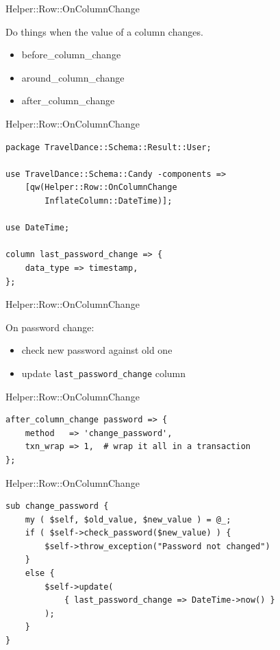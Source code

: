 \begin{frame}[fragile]{Helper::Row::OnColumnChange}

Do things when the value of a column changes.

\begin{itemize}
\item before\_column\_change
\item around\_column\_change
\item after\_column\_change
\end{itemize}

\end{frame}

\begin{frame}[fragile]{Helper::Row::OnColumnChange}

\begin{lstlisting}
package TravelDance::Schema::Result::User;

use TravelDance::Schema::Candy -components =>
    [qw(Helper::Row::OnColumnChange 
        InflateColumn::DateTime)];

use DateTime;

column last_password_change => {
    data_type => timestamp,
};
\end{lstlisting}
\end{frame}

\begin{frame}[fragile]{Helper::Row::OnColumnChange}

On password change:

\begin{itemize}
\item check new password against old one
\item update \verb|last_password_change| column
\end{itemize}

\end{frame}

\begin{frame}[fragile]{Helper::Row::OnColumnChange}
\begin{lstlisting}
after_column_change password => {
    method   => 'change_password',
    txn_wrap => 1,  # wrap it all in a transaction
};
\end{lstlisting}
\end{frame}

\begin{frame}[fragile]{Helper::Row::OnColumnChange}
\begin{lstlisting}
sub change_password {
    my ( $self, $old_value, $new_value ) = @_;
    if ( $self->check_password($new_value) ) {
        $self->throw_exception("Password not changed")
    }
    else {
        $self->update(
            { last_password_change => DateTime->now() }
        );
    }
}
\end{lstlisting}
\end{frame}

